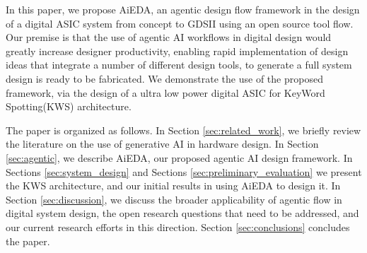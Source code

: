 In this paper, we propose AiEDA, an agentic design flow framework in the design of a digital ASIC system from concept to GDSII using an open source tool flow. Our premise is that the use of agentic AI workflows in digital design would greatly increase designer productivity, enabling rapid implementation of design ideas that integrate a number of different design tools, to generate a full system design is ready to be fabricated. We demonstrate the use of the proposed framework, via the design of a ultra low power digital ASIC for KeyWord Spotting(KWS) architecture. 

The paper is organized as follows. In Section \ref{sec:related_work}, we briefly review the literature on the use of generative AI in hardware design. 
In Section \ref{sec:agentic}, we describe AiEDA, our proposed agentic AI design framework. In Sections \ref{sec:system_design} and Sections \ref{sec:preliminary_evaluation} we present the KWS architecture, and our initial results in using AiEDA to design it. In Section \ref{sec:discussion}, we discuss the broader applicability of agentic flow in digital system design, the open research questions that need to be addressed, and our current research efforts in this direction. Section \ref{sec:conclusions} concludes the paper.

